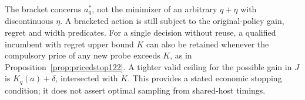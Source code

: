 The bracket concerns $a_q^*$, not the minimizer of an arbitrary
$q+\eta$ with discontinuous $\eta$. A bracketed action is still
subject to the original-policy gain, regret and width predicates.
For a single decision without reuse, a qualified incumbent with
regret upper bound $K$ can also be retained whenever the compulsory
price of any new probe exceeds $K$, as in
Proposition~\ref{prop:pricedstop122}. A tighter valid ceiling for
the possible gain in $J$ is $K_q(a)+\delta$, intersected with $K$.
This provides a stated economic stopping condition; it does not
assert optimal sampling from shared-host timings.
